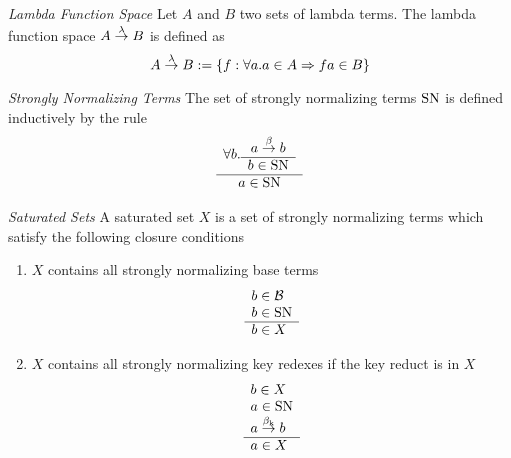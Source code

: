 \begin{definition}
    \emph{Lambda Function Space}
    Let $A$ and $B$ two sets of lambda terms. The lambda function space $A
    \stackrel{\lambda}{\to} B$ is defined as
    $$
    A \stackrel{\lambda}{\to} B := {\{f: \forall a. a \in A \Rightarrow fa \in B\}}
    $$
\end{definition}





\begin{definition}
    \emph{Strongly Normalizing Terms}
    The set of strongly normalizing terms $\text{SN}$ is defined inductively by the
    rule
    $$
    \begin{array}{c} 
        \forall b. \begin{array}{c} a \stackrel{\beta}{\to} b \\ \hline b \in \text{SN}\end{array}
     \\ \hline 
        a \in \text{SN}
    \end{array}
    $$
\end{definition}


\begin{definition}
    \emph{Saturated Sets} A saturated set $X$ is a set of strongly normalizing terms
    which satisfy the following closure conditions
    \begin{enumerate}
    \item $X$ contains all strongly normalizing base terms
        $$
            \begin{array}{l} b \in {\cal B} \\ b \in \text{SN} \\ \hline b \in X\end{array}
        $$

    \item $X$ contains all strongly normalizing key redexes if the key reduct is
        in $X$
        $$
        \begin{array}{l} 
            b \in X
            \\
            a \in \text{SN}
            \\
            a \stackrel{\beta_{\text{k}}}{\to} b
         \\ \hline 
            a \in X
        \end{array}
        $$
    \end{enumerate}
\end{definition}


